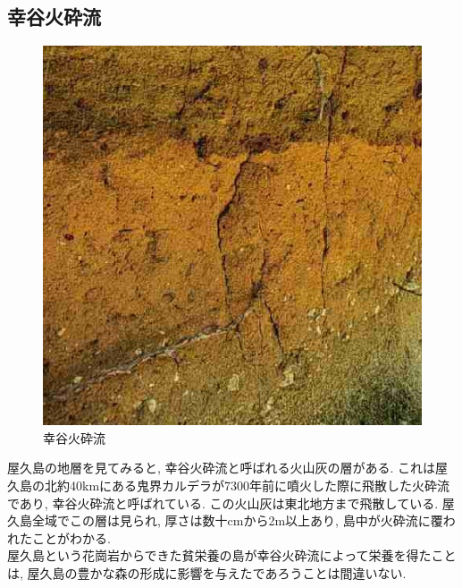 \documentclass[10pt,titlepage,a5paper]{ltjsbook}
\begin{document}
    \subsection*{幸谷火砕流}
      \begin{minipage}{0.33\columnwidth}
        \begin{figure}[H]
          \centering
          \includegraphics[width=\columnwidth]{kasairyu.jpg}
          \caption{幸谷火砕流}
          \label{fig:yakushima_kouya}
        \end{figure}
      \end{minipage}
      \hfill
      \begin{minipage}{0.6\columnwidth}
        屋久島の地層を見てみると, 幸谷火砕流と呼ばれる火山灰の層がある. これは屋久島の北約40kmにある鬼界カルデラが7300年前に噴火した際に飛散した火砕流であり, 幸谷火砕流と呼ばれている.
        この火山灰は東北地方まで飛散している. 屋久島全域でこの層は見られ\footnotemark, 厚さは数十cmから2m以上あり, 島中が火砕流に覆われたことがわかる. \\
        屋久島という花崗岩からできた貧栄養の島が幸谷火砕流によって栄養を得たことは, 屋久島の豊かな森の形成に影響を与えたであろうことは間違いない.
      \end{minipage}
\end{document}
